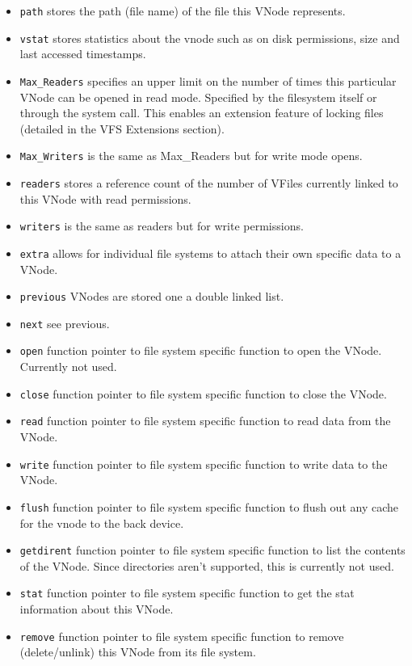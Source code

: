 \documentclass[12pt,english]{article}
\begin{document}
\begin{itemize}
\item \texttt{path} stores the path (file name) of the file this VNode represents.
\item \texttt{vstat} stores statistics about the vnode such as on disk permissions, size and last accessed timestamps.
\item \texttt{Max\_Readers} specifies an upper limit on the number of times this particular VNode can be opened in read mode. Specified by the filesystem itself or through the system call. This enables an extension feature of locking files (detailed in the VFS Extensions section).
\item \texttt{Max\_Writers} is the same as Max\_Readers but for write mode opens.
\item \texttt{readers} stores a reference count of the number of VFiles currently linked to this VNode with read permissions.
\item \texttt{writers} is the same as readers but for write permissions.
\item \texttt{extra} allows for individual file systems to attach their own specific data to a VNode.
\item \texttt{previous} VNodes are stored one a double linked list.
\item \texttt{next} see previous.
\item \texttt{open} function pointer to file system specific function to open the VNode. Currently not used.
\item \texttt{close} function pointer to file system specific function to close the VNode.
\item \texttt{read} function pointer to file system specific function to read data from the VNode.
\item \texttt{write} function pointer to file system specific function to write data to the VNode.
\item \texttt{flush} function pointer to file system specific function to flush out any cache for the vnode to the back device.
\item \texttt{getdirent} function pointer to file system specific function to list the contents of the VNode. Since directories aren't supported, this is currently not used.
\item \texttt{stat} function pointer to file system specific function to get the stat information about this VNode.
\item \texttt{remove} function pointer to file system specific function to remove (delete/unlink) this VNode from its file system.
\end{itemize}
\end{document}
